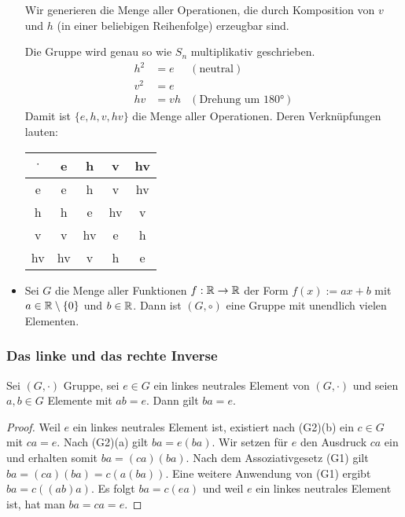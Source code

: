 \begin{bsp}
\begin{itemize}
	Wir generieren die Menge aller Operationen, die durch Komposition von $ v $ und $ h $ (in einer beliebigen Reihenfolge) erzeugbar sind.
	
	Die Gruppe wird genau so wie $ S_n $ multiplikativ geschrieben.
	\begin{align*}
	h^2 &= e &(\text{neutral}) \\
	v^2 &= e \\
	hv &= vh &(\text{Drehung um 180°})
	\end{align*}
	Damit ist $ \{ e,h,v,hv \} $ die Menge aller Operationen. Deren Verknüpfungen lauten:
	
	\begin{center}
	\begin{tabular}{c||c|c|c|c}
		$ \cdot $ & e & h & v & hv \\
		\hline \hline
		e & e & h & v & hv \\
		h & h & e & hv & v \\
		v & v & hv & e & h \\
		hv & hv & v & h & e
	\end{tabular}
	\end{center}
	
	\item Sei $ G $ die Menge aller Funktionen $ f : \mathbb R \to \mathbb R $ der Form $ f(x) := ax + b $ mit $ a \in \mathbb R \setminus \{ 0 \} $ und $ b \in \mathbb R $. Dann ist $ (G,\circ) $ eine Gruppe mit unendlich vielen Elementen.
\end{itemize}
\end{bsp}

\subsubsection{Das linke und das rechte Inverse}


\begin{propn}
	Sei $ (G,\cdot) $ Gruppe, sei $ e \in G $ ein linkes neutrales Element von $ (G,\cdot) $ und seien $ a,b \in  G $ Elemente mit $ ab = e $. Dann gilt $ ba = e $.
\end{propn}
\begin{proof}
	Weil $ e $ ein linkes neutrales Element ist, existiert nach (G2)(b) ein $ c \in G $ mit $ ca = e $. Nach (G2)(a) gilt $ ba = e(ba) $. Wir setzen für $ e $ den Ausdruck $ ca $ ein und erhalten somit $ ba = (ca)(ba) $. Nach dem Assoziativgesetz (G1) gilt $ ba = (ca)(ba) = c(a(ba)) $. Eine weitere Anwendung von (G1) ergibt $ ba = c((ab)a) $. Es folgt $ ba = c(ea) $ und weil $ e $ ein linkes neutrales Element ist, hat man $ ba = ca = e $.
\end{proof}

